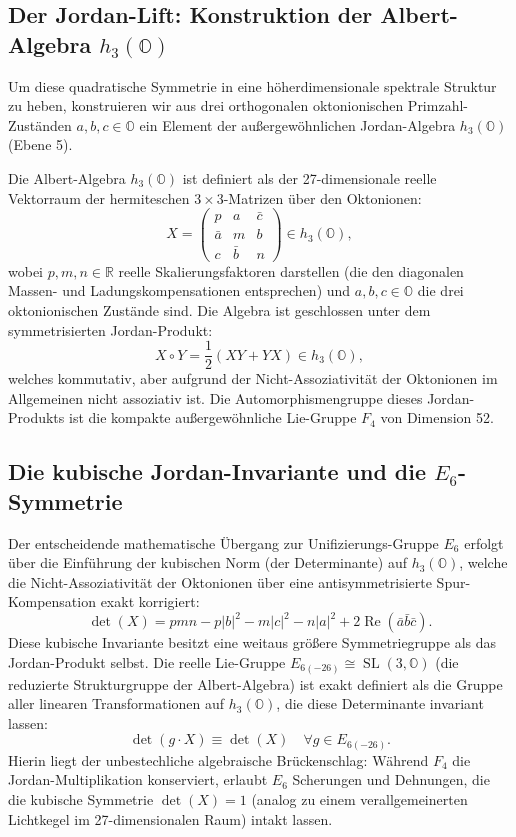 \documentclass[11pt,a4paper]{article}
\theoremstyle{definition}
\begin{document}
	\subsection{Der Jordan-Lift: Konstruktion der Albert-Algebra $h_3(\mathbb{O})$}
	Um diese quadratische Symmetrie in eine höherdimensionale spektrale Struktur zu heben, konstruieren wir aus drei orthogonalen oktonionischen Primzahl-Zuständen $a, b, c \in \mathbb{O}$ ein Element der außergewöhnlichen Jordan-Algebra $h_3(\mathbb{O})$ (Ebene 5). 
	
	Die Albert-Algebra $h_3(\mathbb{O})$ ist definiert als der 27-dimensionale reelle Vektorraum der hermiteschen $3 \times 3$-Matrizen über den Oktonionen:
	\begin{equation}
		X = \begin{pmatrix} p & a & \bar{c} \\ \bar{a} & m & b \\ c & \bar{b} & n \end{pmatrix} \in h_3(\mathbb{O}),
	\end{equation}
	wobei $p, m, n \in \mathbb{R}$ reelle Skalierungsfaktoren darstellen (die den diagonalen Massen- und Ladungskompensationen entsprechen) und $a, b, c \in \mathbb{O}$ die drei oktonionischen Zustände sind. Die Algebra ist geschlossen unter dem symmetrisierten Jordan-Produkt:
	\begin{equation}
		X \circ Y = \frac{1}{2}(XY + YX) \in h_3(\mathbb{O}),
	\end{equation}
	welches kommutativ, aber aufgrund der Nicht-Assoziativität der Oktonionen im Allgemeinen nicht assoziativ ist. Die Automorphismengruppe dieses Jordan-Produkts ist die kompakte außergewöhnliche Lie-Gruppe $F_4$ von Dimension 52.
	
	\subsection{Die kubische Jordan-Invariante und die $E_6$-Symmetrie}
	Der entscheidende mathematische Übergang zur Unifizierungs-Gruppe $E_6$ erfolgt über die Einführung der kubischen Norm (der Determinante) auf $h_3(\mathbb{O})$, welche die Nicht-Assoziativität der Oktonionen über eine antisymmetrisierte Spur-Kompensation exakt korrigiert:
	\begin{equation}
		\label{eq:jordan_det}
		\det(X) = pmn - p|b|^2 - m|c|^2 - n|a|^2 + 2\operatorname{Re}(\bar{a}\bar{b}\bar{c}).
	\end{equation}
	Diese kubische Invariante besitzt eine weitaus größere Symmetriegruppe als das Jordan-Produkt selbst. Die reelle Lie-Gruppe $E_{6(-26)} \cong \operatorname{SL}(3, \mathbb{O})$ (die reduzierte Strukturgruppe der Albert-Algebra) ist exakt definiert als die Gruppe aller linearen Transformationen auf $h_3(\mathbb{O})$, die diese Determinante invariant lassen:
	\begin{equation}
		\det(g \cdot X) \equiv \det(X) \quad \forall g \in E_{6(-26)}.
	\end{equation}
	Hierin liegt der unbestechliche algebraische Brückenschlag: Während $F_4$ die Jordan-Multiplikation konserviert, erlaubt $E_6$ Scherungen und Dehnungen, die die kubische Symmetrie $\det(X) = 1$ (analog zu einem verallgemeinerten Lichtkegel im 27-dimensionalen Raum) intakt lassen.
	
\end{document}
